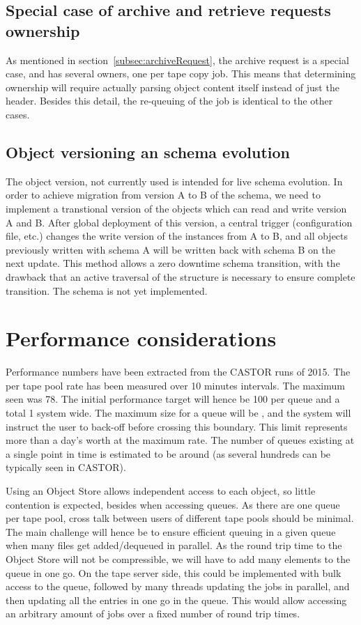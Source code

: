 \subsection{Special case of archive and retrieve requests ownership}
\label{subsec:requestsOwnership}
As mentioned in section~\ref{subsec:archiveRequest}, the archive request is a special case, and has several owners, one per tape copy job. This means that determining ownership will require actually parsing object content itself instead of just the header. Besides this detail, the re-queuing of the job is identical to the other cases.

\subsection{Object versioning an schema evolution}
The object version, not currently used is intended for live schema evolution. In order to achieve migration from version A to B of the schema, we need to implement a transtional version of the objects which can read and write version A and B. After global deployment of this version, a central trigger (configuration file, etc.) changes the write version of the instances from A to B, and all objects previously written with schema A will be written back with schema B on the next update. This method allows a zero downtime schema transition, with the drawback that an active traversal of the structure is necessary to ensure complete transition. The schema is not yet implemented.

\section{Performance considerations}
\label{sec:perf}
Performance numbers have been extracted from the CASTOR runs of 2015. The per tape pool rate has been measured over 10 minutes intervals. The maximum seen was \unit{78}{\hertz}. The initial performance target will hence be \unit{100}{\hertz} per queue and a total \unit{1}{\kilo\hertz} system wide. The maximum size for a queue will be , and the system will instruct the user to back-off before crossing this boundary. This limit represents more than a day's worth at the maximum rate. The number of queues existing at a single point in time is estimated to be around  (as several hundreds can be typically seen in CASTOR).

Using an Object Store allows independent access to each object, so little contention is expected, besides when accessing queues. As there are one queue per tape pool, cross talk between users of different tape pools should be minimal. The main challenge will hence be to ensure efficient queuing in a given queue when many files get added/dequeued in parallel. As the round trip time to the Object Store will not be compressible, we will have to add many elements to the queue in one go. On the tape server side, this could be implemented with bulk access to the queue, followed by many threads updating the jobs in parallel, and then updating all the entries in one go in the queue. This would allow accessing an arbitrary amount of jobs over a fixed number of round trip times.

